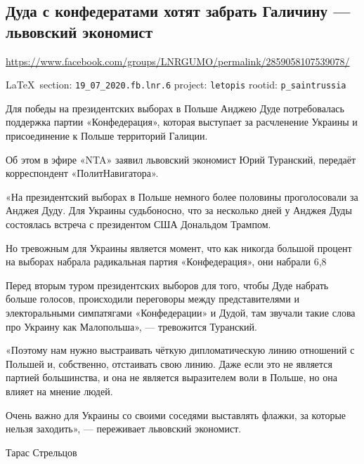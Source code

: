  
 
\subsection{Дуда с конфедератами хотят забрать Галичину --- львовский экономист}
\label{sec:19_07_2020.fb.lnr.6}
\url{https://www.facebook.com/groups/LNRGUMO/permalink/2859058107539078/}
  
\vspace{0.5cm}
{\small\LaTeX~section: \verb|19_07_2020.fb.lnr.6| project: \verb|letopis| rootid: \verb|p_saintrussia|}
\vspace{0.5cm}
 
Для победы на президентских выборах в Польше Анджею Дуде потребовалась
поддержка партии «Конфедерация», которая выступает за расчленение Украины и
присоединение к Польше территорий Галиции.

Об этом в эфире «NTA» заявил львовский экономист Юрий Туранский, передаёт
корреспондент «ПолитНавигатора».

«На президентский выборах в Польше немного более половины проголосовали за
Анджея Дуду. Для Украины судьбоносно, что за несколько дней у Анджея Дуды
состоялась встреча с президентом США Дональдом Трампом.

Но тревожным для Украины является момент, что как никогда большой процент на
выборах набрала радикальная партия «Конфедерация», они набрали 6,8%

Перед вторым туром президентских выборов для того, чтобы Дуде набрать больше
голосов, происходили переговоры между представителями и электоральными
симпатягами «Конфедерации» и Дудой, там звучали такие слова про Украину как
Малопольша», --- тревожится Туранский.

«Поэтому нам нужно выстраивать чёткую дипломатическую линию отношений с Польшей
и, собственно, отстаивать свою линию. Даже если это не является партией
большинства, и она не является выразителем воли в Польше, но она влияет на
мнение людей.

Очень важно для Украины со своими соседями выставлять флажки, за которые нельзя
заходить», --- переживает львовский экономист.

Тарас Стрельцов 
